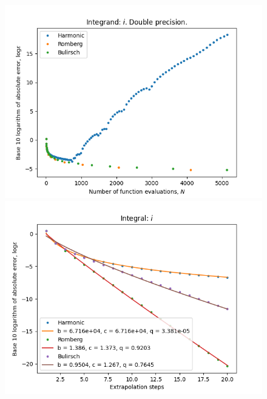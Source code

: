 \begin{figure}[H]
\centering
\begin{minipage}{0.45\textwidth}
\centering
\includegraphics[scale=0.45]{romberg_plots/circle_area.png}
\end{minipage}
\begin{minipage}{0.45\textwidth}
\centering
\includegraphics[scale=0.45]{romberg_plots/circle_area_hp_steps.png}
\end{minipage}
\end{figure}

